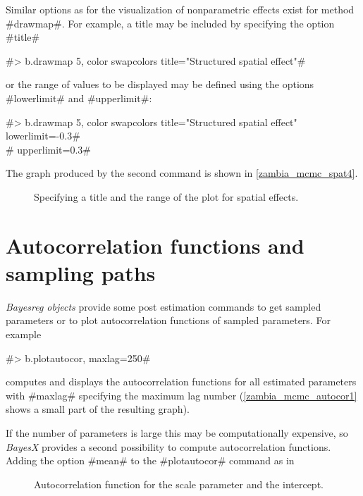 \documentclass[11pt,a4paper,twoside]{bayesxreport}
\begin{document}
Similar options as for the visualization of nonparametric effects
exist for method #drawmap#. For example, a title may be included by
specifying the option #title#

#> b.drawmap 5, color swapcolors title="Structured spatial effect"#

or the range of values to be displayed may be defined using the
options #lowerlimit# and #upperlimit#:

#> b.drawmap 5, color swapcolors title="Structured spatial effect" lowerlimit=-0.3#\\
#  upperlimit=0.3#

The graph produced by the second command is shown in
\autoref{zambia_mcmc_spat4}.

\begin{figure}[ht]
\begin{center}
{\it\caption{Specifying a title and the range of the plot for
spatial effects.\label{zambia_mcmc_spat4}}}
\end{center}
\end{figure}

\section{Autocorrelation functions and sampling
paths}\label{zambia_mcmc_postest}

{\em Bayesreg objects} provide some post estimation commands to get
sampled parameters or to plot autocorrelation functions of sampled
parameters. For example

#> b.plotautocor, maxlag=250#

computes and displays the autocorrelation functions for all
estimated parameters with #maxlag# specifying the maximum lag number
(\autoref{zambia_mcmc_autocor1} shows a small part of the resulting
graph).

If the number of parameters is large this may be computationally
expensive, so {\it BayesX} provides a second possibility to compute
autocorrelation functions. Adding the option #mean# to the
#plotautocor# command as in

\begin{figure}[ht]
\begin{center}
{\it\caption{Autocorrelation function for the scale parameter and
the intercept.\label{zambia_mcmc_autocor1}}}
\end{center}
\end{figure}
\end{document}
